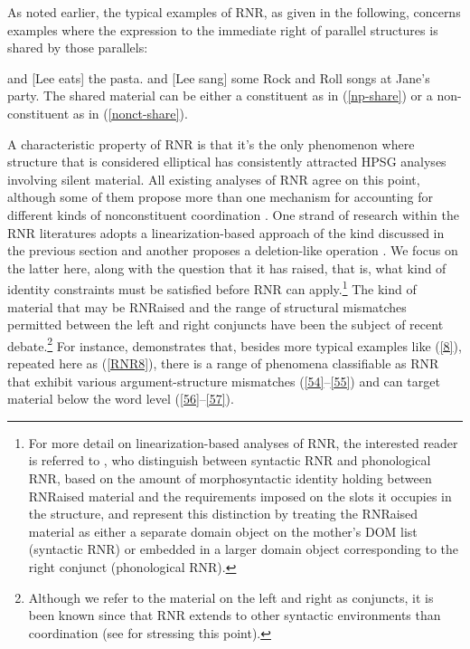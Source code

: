 \documentclass[output=paper
                ,modfonts
                ,nonflat
	        ,collection
	        ,collectionchapter
	        ,collectiontoclongg
 	        ,biblatex
                ,babelshorthands
                ,newtxmath
                ,draftmode
                ,colorlinks, citecolor=brown
]{./langsci/langscibook}
\begin{document}
As noted earlier, the typical examples of RNR, as given in the following, concerns examples where the expression to the immediate right of parallel structures is shared by those
parallels:

\ea {} and [Lee eats] the pasta.  \z \label{np-share}
\ea {} and [Lee sang] some Rock and Roll songs at Jane's party.\z \label{nonct-share}
%
The shared material can be either a constituent as in (\ref{np-share}) or a non-constituent as in (\ref{nonct-share}).

A characteristic property of RNR is that it's the only phenomenon where structure that is considered elliptical has consistently attracted HPSG analyses involving silent material.
All existing analyses of RNR \citep{Abeille2016, Beavers2004, Chaves2008-in-lexicon, Chaves2014, Crysmann2003, Shiraishi2019, Yatabe2001, Yatabe2012} agree on this point, although some of them propose more than one mechanism for accounting for different kinds of nonconstituent coordination \citep{Chaves2014, Yatabe2001, Yatabe2012, Yatabe2019}. One strand of research within the RNR literatures adopts a linearization-based approach of the kind discussed in the previous section \citep{Yatabe2001, Yatabe 2012} and another proposes a deletion-like operation \citep{Abeille2016, Chaves2014, Shiraishi2019}. We focus on the latter here, along with the question that it has raised, that is, what kind of identity constraints must be satisfied before RNR can apply.\footnote{For more detail on linearization-based analyses of RNR, the interested reader is referred to \citet{Yatabe2001, Yatabe2012}, who distinguish between syntactic RNR and phonological RNR, based on the amount of morphosyntactic identity holding between RNRaised material and the requirements imposed on the slots it occupies in the structure, and represent this distinction by treating the RNRaised material as either a separate domain object on the mother's DOM list (syntactic RNR) or embedded in a larger domain object corresponding to the right conjunct (phonological RNR).}
The kind of material that may be RNRaised and the range of structural mismatches permitted between the left and right conjuncts have been the subject of recent debate.\footnote{Although we refer to the material on the left and right as conjuncts, it is been known since \citet{Hudson1976, Hudson1989} that RNR extends to other syntactic environments than coordination (see \citealt{Chaves2014} for stressing this point).} For instance, \citet[839--840]{Chaves2014} demonstrates that, besides more typical examples like (\ref{8}), repeated here as (\ref{RNR8}), there is a range of phenomena classifiable as RNR that exhibit various argument-structure mismatches (\ref{54}--\ref{55}) and can target material below the word level (\ref{56}--\ref{57}).
\end{document}
